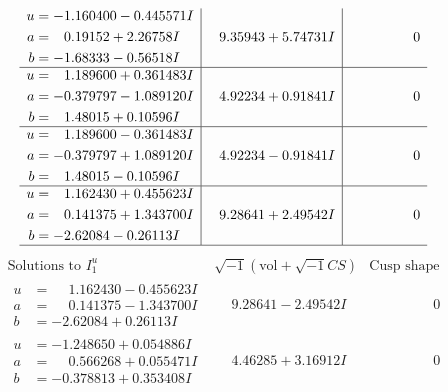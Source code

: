 \documentclass[1p]{elsarticle_modified}
\theoremstyle{definition}
\newcommand{\I}{\sqrt{-1}}
\begin{document}
$$\begin{array}{c|c|c}
\begin{aligned}
u &= -1.160400 - 0.445571 I \\
a &= \phantom{-}0.19152 + 2.26758 I \\
b &= -1.68333 - 0.56518 I\end{aligned}
 & \phantom{-}9.35943 + 5.74731 I & \phantom{-0.000000 } 0 \\ \hline\begin{aligned}
u &= \phantom{-}1.189600 + 0.361483 I \\
a &= -0.379797 - 1.089120 I \\
b &= \phantom{-}1.48015 + 0.10596 I\end{aligned}
 & \phantom{-}4.92234 + 0.91841 I & \phantom{-0.000000 } 0 \\ \hline\begin{aligned}
u &= \phantom{-}1.189600 - 0.361483 I \\
a &= -0.379797 + 1.089120 I \\
b &= \phantom{-}1.48015 - 0.10596 I\end{aligned}
 & \phantom{-}4.92234 - 0.91841 I & \phantom{-0.000000 } 0 \\ \hline\begin{aligned}
u &= \phantom{-}1.162430 + 0.455623 I \\
a &= \phantom{-}0.141375 + 1.343700 I \\
b &= -2.62084 - 0.26113 I\end{aligned}
 & \phantom{-}9.28641 + 2.49542 I & \phantom{-0.000000 } 0\\
 \hline 
 \end{array}$$\newpage$$\begin{array}{c|c|c}  
\text{Solutions to }I^u_{1}& \I (\text{vol} + \sqrt{-1}CS) & \text{Cusp shape}\\
 \hline 
\begin{aligned}
u &= \phantom{-}1.162430 - 0.455623 I \\
a &= \phantom{-}0.141375 - 1.343700 I \\
b &= -2.62084 + 0.26113 I\end{aligned}
 & \phantom{-}9.28641 - 2.49542 I & \phantom{-0.000000 } 0 \\ \hline\begin{aligned}
u &= -1.248650 + 0.054886 I \\
a &= \phantom{-}0.566268 + 0.055471 I \\
b &= -0.378813 + 0.353408 I\end{aligned}
 & \phantom{-}4.46285 + 3.16912 I & \phantom{-0.000000 } 0 \\ \hline\begin{aligned}

\end{aligned}
\end{array}$$
\end{document}
